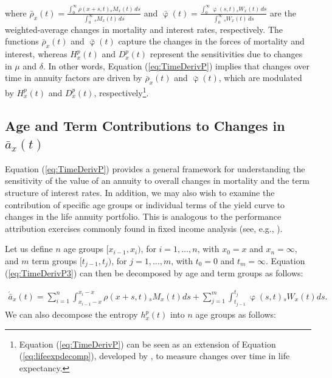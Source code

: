 \documentclass[12pt]{article}
\begin{document}
{where $\bar{\rho}_x(t) = \frac{\int_0^\infty \rho(x+s,t) {}_s M_x(t) \, ds}{\int_0^\infty {}_s M_x(t) \, ds}$ and 
$\bar{\upvarphi}(t) = \frac{\int_0^\infty \upvarphi(s,t) {}_s W_x(t) \, ds}{\int_0^\infty {}_s W_x(t) \, ds}$ are the weighted-average changes in mortality and interest rates, respectively. The functions $\bar{\rho}_x(t)$ and $\bar{\upvarphi}(t)$ capture the changes in the forces of mortality and interest, whereas ${H}^{p}_x(t)$ and ${D}^{p}_x(t)$ represent the sensitivities due to changes in $\mu$ and $\delta$. In other words, Equation (\ref{eq:TimeDerivP}) implies that changes over time in annuity factors are driven by $\bar{\rho}_x(t)$ and $\bar{\upvarphi}(t)$, which are modulated by ${H}^{p}_x(t)$ and ${D}^{p}_x(t)$, respectively\footnote{Equation (\ref{eq:TimeDerivP}) can be seen as an extension of Equation (\ref{eq:lifeexpdecomp}), developed by \citet{Vaupel2003}, to measure changes over time in life expectancy.}.

\subsection{Age and Term Contributions to Changes in $\bar{a}_x(t)$}

 
 Equation (\ref{eq:TimeDerivP}) provides a general framework for understanding the sensitivity of the value of an annuity to overall changes in mortality and the term structure of interest rates. In addition, we may also wish to examine the contribution of specific age groups or individual terms of the yield curve to changes in the life annuity portfolio. This is analogous to the performance attribution exercises commonly found in fixed income analysis (see, e.g., \citet{Daul2012}).
 
 Let us define $n$ age groups $[x_{i-1}, x_i)$, for $i=1,\ldots,n$, with $x_0 = x$ and $x_n = \infty$, and $m$ term groups $[t_{j-1}, t_j)$, for $j=1,\ldots,m$, with $t_0 = 0$ and $t_m = \infty$. Equation (\ref{eq:TimeDerivP3}) can then be decomposed by age and term groups as follows:
 

\begin{equation}\label{eq:TimeDerivAge}
\begin{split}
 \acute{\bar{a}}_x(t) = \sum_{i=1}^n\int_{x_{i-1}-x}^{x_i-x}  \rho(x+s,t) {}_sM_x(t)  ds +\sum_{j=1}^m\int_{t_{j-1}}^{t_j}   \upvarphi(s,t) {}_sW_x(t)  ds.  
\end{split}
\end{equation}
We can also decompose the entropy $h_x^p(t)$ into $n$ age groups as follows:

}
\end{document}
